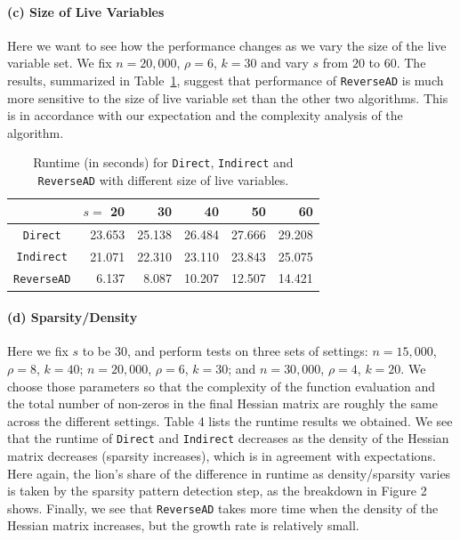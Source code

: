 \documentclass[11pt, a4paper, english]{article}
\begin{document}
\paragraph{(c) Size of Live Variables} 
Here we want to see how the performance changes as we vary the size of the live variable set.
We fix $n = 20,000$, $\rho = 6$, $k = 30$ and vary $s$ from $20$ to $60$. The results, summarized in Table~\ref{tab:live}, suggest that performance of {\tt ReverseAD} is much more sensitive to the size of live variable set than the other two algorithms. This is in accordance with our expectation and the complexity analysis of the algorithm.
\begin{table}[htbp]
\begin{center}
\begin{tabular}{ | c | r | r | r | r | r |}
\hline
& $s=$ 20 & 30 & 40 & 50 & 60 \\
\hline
{\tt Direct} & 23.653 & 25.138 & 26.484 & 27.666 & 29.208\\
{\tt Indirect} & 21.071 & 22.310 & 23.110 & 23.843 & 25.075\\
{\tt ReverseAD} & 6.137 & 8.087 & 10.207 & 12.507 & 14.421\\
\hline 
\end{tabular}
\caption{Runtime (in seconds) for {\tt Direct}, {\tt Indirect} and {\tt ReverseAD} with different size of live variables.}
\label{tab:live}
\end{center}
\end{table}

\paragraph{(d) Sparsity/Density} 
Here we fix $s$ to be  $30$, and perform tests on three sets of settings: $n=15,000$, $\rho = 8$, $k=40$; $n=20,000$, $\rho=6$, $k=30$; and $n=30,000$, $\rho=4$, $k=20$. 
We choose those parameters so that the complexity of the function evaluation and the total number of non-zeros in the final Hessian matrix are roughly the same across the different settings. 
Table 4 lists the runtime results we obtained.
We see that the runtime of {\tt Direct} and {\tt Indirect} decreases as the density of the Hessian matrix decreases (sparsity increases), which is in agreement with expectations.
Here again, the lion's share of the difference in runtime as density/sparsity varies is taken by the sparsity pattern detection step, as the breakdown in Figure 2 shows. 
Finally, we see that {\tt ReverseAD} takes more time when the density of the Hessian matrix increases, but the growth rate is relatively small.
\end{document}
